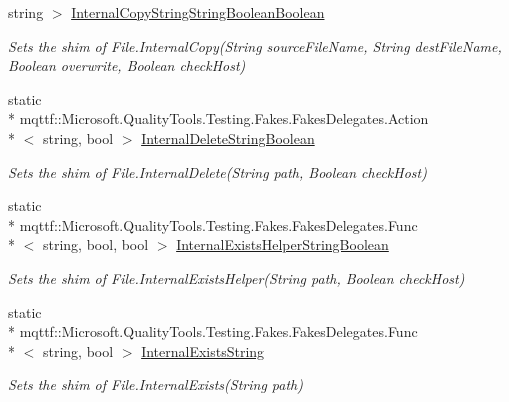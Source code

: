 \begin{DoxyCompactItemize}
string $>$ \hyperlink{class_system_1_1_i_o_1_1_fakes_1_1_shim_file_a4213280e70282b06e00d8146997d1ef0}{Internal\-Copy\-String\-String\-Boolean\-Boolean}
\begin{DoxyCompactList}\small\item\em Sets the shim of File.\-Internal\-Copy(\-String source\-File\-Name, String dest\-File\-Name, Boolean overwrite, Boolean check\-Host)\end{DoxyCompactList}\item 
static \\*
mqttf\-::\-Microsoft.\-Quality\-Tools.\-Testing.\-Fakes.\-Fakes\-Delegates.\-Action\\*
$<$ string, bool $>$ \hyperlink{class_system_1_1_i_o_1_1_fakes_1_1_shim_file_adbe282618bf51c93693920b8accaca19}{Internal\-Delete\-String\-Boolean}
\begin{DoxyCompactList}\small\item\em Sets the shim of File.\-Internal\-Delete(\-String path, Boolean check\-Host)\end{DoxyCompactList}\item 
static \\*
mqttf\-::\-Microsoft.\-Quality\-Tools.\-Testing.\-Fakes.\-Fakes\-Delegates.\-Func\\*
$<$ string, bool, bool $>$ \hyperlink{class_system_1_1_i_o_1_1_fakes_1_1_shim_file_aac742cec73025df6089bd5f146f4af23}{Internal\-Exists\-Helper\-String\-Boolean}
\begin{DoxyCompactList}\small\item\em Sets the shim of File.\-Internal\-Exists\-Helper(\-String path, Boolean check\-Host)\end{DoxyCompactList}\item 
static \\*
mqttf\-::\-Microsoft.\-Quality\-Tools.\-Testing.\-Fakes.\-Fakes\-Delegates.\-Func\\*
$<$ string, bool $>$ \hyperlink{class_system_1_1_i_o_1_1_fakes_1_1_shim_file_a98b9cdf6f923c5bf5ec6400e7895f22b}{Internal\-Exists\-String}
\begin{DoxyCompactList}\small\item\em Sets the shim of File.\-Internal\-Exists(\-String path)\end{DoxyCompactList}\item 

\end{DoxyCompactItemize}
